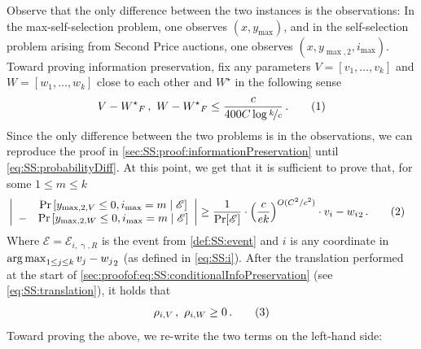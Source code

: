 \documentclass[11pt,letterpaper]{article}
\theoremstyle{plain}
\theoremstyle{definition}
\theoremstyle{remark}
\newcommand{\yesnum}{\addtocounter{equation}{1}\tag{\theequation}}
\def\abs#1{\left| #1 \right|}
\newcommand{\inparen}[1]{\ensuremath{\left(#1\right)}}
\newcommand{\insquare}[1]{\ensuremath{\left[#1\right]}}
\let\norm\relax
\newcommand{\norm}[1]{\ensuremath{\left\lVert #1 \right\rVert}}
\newcommand{\evE}{\ensuremath{\mathscr{E}}}
\newcommand{\argmax}{\operatornamewithlimits{arg\,max}}
\newcommand{\nfrac}[2]{\nicefrac{#1}{#2}}
\renewcommand{\gamma}{\upgamma}
\newcommand{\Wstar}{{W^\star}}
\newcommand{\ymax}{y_{\max}}
\newcommand{\smax}{\max,2} %
\newcommand{\imax}{i_{\max}}
\newcommand{\ysmax}{y_{\smax}}
\begin{document}
{{    Observe that the only difference between the two instances is the observations:
    In the max-self-selection problem, one observes $(x,\ymax)$, and in the self-selection problem arising from Second Price auctions, one observes $(x,\ysmax,\imax)$.
    Toward proving information preservation, 
    fix any parameters $V=[v_1,\dots,v_k]$ and $W=[w_1,\dots,w_k]$ close to each other and $\Wstar$ in the following sense  
    \[
        \norm{V - W^\star}_F\,,~\norm{W - W^\star}_F
        \leq \frac{c}{{400C\log{\nfrac{k}{c}}}}\,.
        \yesnum\label{eq:2ndPrice:distance}
    \]
    Since the only difference between the two problems is in the observations, we can reproduce the proof in \cref{sec:SS:proof:informationPreservation} until \cref{eq:SS:probabilityDiff}.
    At this point, we get that it is sufficient to prove that, for some $1\leq m\leq k$
    \begin{align*}
        &\abs{
            \begin{array}{cc}
                &\Pr\insquare{y_{\smax, V} \leq 0, \imax=m\mid \evE}\\
                - &\Pr\insquare{y_{\smax, W} \leq 0, \imax=m\mid \evE}
            \end{array}
        }
        \geq %
        \frac{1}{\Pr[\evE]}
        \cdot \inparen{\frac{c}{ek}}^{O(C^2/c^2)}
        \cdot \norm{v_i-w_i}_2\,.
        \yesnum\label{eq:2ndPrice:probAsDiff}
    \end{align*}
    Where $\evE=\evE_{i,\gamma,R}$ is the event from \cref{def:SS:event} and $i$ is any coordinate in $\argmax_{1\leq j\leq k} \norm{v_j-w_j}_2$ (as defined in \cref{eq:SS:i}).
    After the translation performed at the start of \cref{sec:proofof:eq:SS:conditionalInfoPreservation} (see \cref{eq:SS:translation}), it holds that 
    \[
        \rho_{i,V}\,, ~\rho_{i,W}\geq 0\,.
        \yesnum\label{eq:2ndPrice:2}
    \]
    Toward proving the above, we re-write the two terms on the left-hand side:
    
}}
\end{document}
